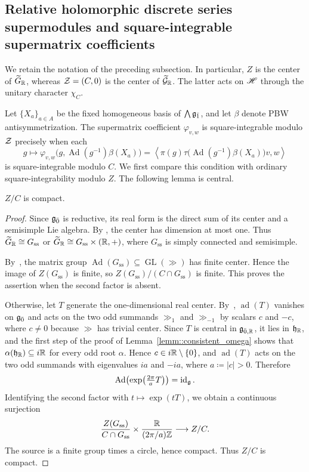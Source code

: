 \subsection{Relative holomorphic discrete series supermodules and square-integrable supermatrix coefficients}

We retain the notation of the preceding subsection. In particular, $Z$ is the center of $\widetilde{G}_{{\mathbb R}}$, whereas ${\mathcal{Z}}=(C,0)$ is the center of $\widetilde{{\mathcal{G}}}_{{\mathbb R}}$. The latter acts on ${\mathscr{H}}$ through the unitary character $\chi_C$.

Let $\{X_{a}\}_{a\in A}$ be the fixed homogeneous basis of $\bigwedge{\mathfrak{g}_{\bar{1}}}$, and let $\beta$ denote PBW antisymmetrization. The supermatrix coefficient $\varphi_{v,w}$ is square-integrable modulo ${\mathcal{Z}}$ precisely when each
\begin{equation}
g\longmapsto
\varphi_{v,w}\bigl(g,\operatorname{Ad}(g^{-1})\beta(X_{a})\bigr)
=
\left\langle
\pi(g)\tau\bigl(\operatorname{Ad}(g^{-1})\beta(X_{a})\bigr)v,w
\right\rangle
\end{equation}
is square-integrable modulo $C$. We first compare this condition with ordinary square-integrability modulo $Z$. The following lemma is central.

\begin{lemma}\label{lemm::Z_mod_C_compact}
    $Z/C$ is compact.
\end{lemma}

\begin{proof}
Since ${\mathfrak{g}_{\bar{0}}}$ is reductive, its real form is the direct sum of
its center and a semisimple Lie algebra. By
\cite[Corollary~1.2.8]{musson2012lie}, the center has dimension at most one.
Thus
$
\widetilde{G}_{{\mathbb R}}\cong G_{\mathrm{ss}}$ or $
\widetilde{G}_{{\mathbb R}}\cong G_{\mathrm{ss}}\times({\mathbb R},+)$,
where $G_{\mathrm{ss}}$ is simply connected and semisimple.

By~\cite[Proposition~7.9]{Knapp}, the matrix group
$\operatorname{Ad}(G_{\mathrm{ss}})\subseteq\operatorname{GL}(\gg)$
has finite center. Hence the image of $Z(G_{\mathrm{ss}})$ is finite,
so
$
Z(G_{\mathrm{ss}})/(C\cap G_{\mathrm{ss}})
$
is finite. This proves the assertion when the second factor is absent.

Otherwise, let $T$ generate the one-dimensional real center.
By~\cite[Corollary~1.2.8]{musson2012lie}, $\operatorname{ad}(T)$ vanishes on ${\mathfrak{g}_{\bar{0}}}$ and
acts on the two odd summands $\gg_{1}$ and $\gg_{-1}$ by scalars $c$ and $-c$, where
$c\neq0$ because $\gg$ has trivial center. Since $T$ is central in ${\mathfrak{g}}_{\bar0,{\mathbb R}}$, it
lies in ${\mathfrak h}_{{\mathbb R}}$, and the first step of the proof of Lemma~\ref{lemm::consistent_omega}
shows that $\alpha({\mathfrak h}_{{\mathbb R}})\subseteq i{\mathbb R}$ for every odd root $\alpha$. Hence
$c\in i{\mathbb R}\setminus\{0\}$, and $\operatorname{ad}(T)$ acts on the two odd summands with
eigenvalues $ia$ and $-ia$, where $a\coloneqq|c|>0$. Therefore
\[
\operatorname{Ad}\!\left(\exp\!\left(\tfrac{2\pi}{a}T\right)\right)
=\operatorname{id}_{{\mathfrak{g}}}.
\]
Identifying the second factor with $t\mapsto\exp(tT)$, we obtain
a continuous surjection
\[
\frac{Z(G_{\mathrm{ss}})}{C\cap G_{\mathrm{ss}}}
\times
\frac{{\mathbb R}}{(2\pi/a){\mathbb Z}}
\longrightarrow Z/C.
\]
The source is a finite group times a circle, hence compact.
Thus $Z/C$ is compact.
\end{proof}

